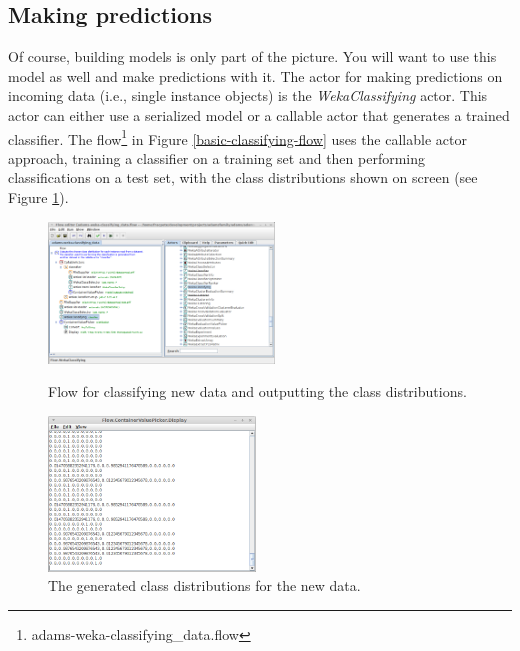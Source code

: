 \clearpage
\subsection{Making predictions}
Of course, building models is only part of the picture. You will want to use
this model as well and make predictions with it. The actor for making
predictions on incoming data (i.e., single instance objects) is the
\textit{WekaClassifying} actor. This actor can either use a serialized model or
a callable actor that generates a trained classifier. The
flow\footnote{adams-weka-classifying\_data.flow} in Figure
\ref{basic-classifying-flow} uses the callable actor approach, training a
classifier on a training set and then performing classifications on a test set,
with the class distributions shown on screen (see Figure
\ref{basic-classifying-output}).

\begin{figure}[ht]
  \begin{minipage}[t]{0.5\linewidth}
    \centering
    \includegraphics[width=6.0cm]{images/basic-classifying-flow.png}
    \caption{Flow for classifying new data and outputting the class
    distributions.}
    \label{basic-classifying-flow}
  \end{minipage}
  \hspace{0.5cm}
  \begin{minipage}[t]{0.5\linewidth}
    \centering
    \includegraphics[width=5.5cm]{images/basic-classifying-output.png}
    \caption{The generated class distributions for the new data.}
    \label{basic-classifying-output}
  \end{minipage}
\end{figure}

